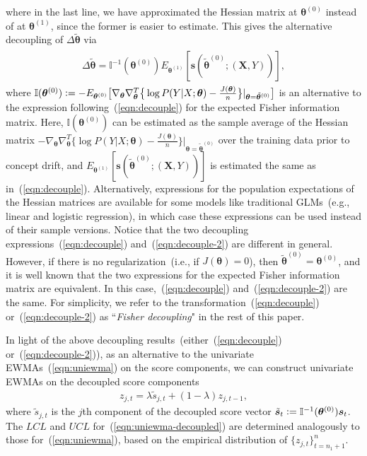 \documentclass[twoside,11pt]{article}
\begin{document}
where in the last line, we have approximated the Hessian matrix at $\bm{\theta}^{(0)}$ instead of at $\bm{\theta}^{(1)}$, since the former is easier to estimate. This gives the alternative decoupling of $\Delta \tilde{\bm { \theta}}$ via 
\begin{align}
\begin{aligned}
 \Delta \tilde{\bm { \theta}} = \mathbb {I}^{-1}(\bm { \theta}^{ (0)}) E_{\bm{ \theta}^{ (1)}}[\bm{s}(\tilde{ \bm { \theta}} ^{ (0)}; (\bm {X}, Y))], 
\end{aligned}
\label{eqn:decouple-2}
\end{align}
where $\mathbb {I}(\bm { \theta}^{ (0)}) \vcentcolon= - E_{\bm { \theta}^{ (0)}} \big[ \nabla_{\bm{\theta}} \nabla^T_{\bm{\theta}} \big\{ \log{P(Y | X; \bm{\theta})} - \frac{J(\bm{\theta})}{n} \big\} |_{\bm{\theta} = \tilde{\bm{\theta}}^{(0)}} \big]$ is an alternative to the expression following~(\ref{eqn:decouple}) for the expected Fisher information matrix. Here, $\mathbb {I}(\bm { \theta}^{ (0)})$ can be estimated as the sample average of the Hessian matrix $-\nabla_{\bm{\theta}} \nabla^T_{\bm{\theta}} \big\{ \log{P(Y | X; \bm{\theta})} - \frac{J(\bm{\theta})}{n} \big\} |_{\bm{\theta} = \tilde{\bm{\theta}}^{(0)}}$ over the training data prior to concept drift, and $E_{\bm{ \theta}^{ (1)}} [\bm{s}(\tilde{ \bm { \theta}} ^{ (0)}; (\bm {X}, Y))]$ is estimated the same as in~(\ref{eqn:decouple}). Alternatively, expressions for the population expectations of the Hessian matrices are available for some models like traditional GLMs~(e.g., linear and logistic regression), in which case these expressions can be used instead of their sample versions. Notice that the two decoupling expressions~(\ref{eqn:decouple}) and~(\ref{eqn:decouple-2}) are different in general. However, if there is no regularization~(i.e., if $J(\bm{\theta}) = 0$), then $\tilde{ \bm { \theta}} ^{ (0)} = \bm { \theta} ^{ (0)}$, and it is well known that the two expressions for the expected Fisher information matrix are equivalent. In this case,~(\ref{eqn:decouple}) and~(\ref{eqn:decouple-2}) are the same. For simplicity, we refer to the transformation~(\ref{eqn:decouple}) or~(\ref{eqn:decouple-2}) as ``\textit{Fisher decoupling}" in the rest of this paper.
 
In light of the above decoupling results~(either~(\ref{eqn:decouple}) or~(\ref{eqn:decouple-2})), as an alternative to the univariate EWMAs~(\ref{eqn:uniewma}) on the score components, we can construct univariate EWMAs on the decoupled score components
\begin{align}
z_{j,t} = \lambda \tilde{s}_{j,t} + (1 - \lambda) z_{j,t-1},
\label{eqn:uniewma-decoupled}
\end{align}
where $\tilde{s}_{j,t}$ is the $j$th component of the decoupled score vector $\tilde{\bm{s}}_t \vcentcolon= \mathbb {I}^{-1}(\bm { \theta}^{ (0)})\bm{s}_t$. The $LCL$ and $UCL$ for~(\ref{eqn:uniewma-decoupled}) are determined analogously to those for~(\ref{eqn:uniewma}), based on the empirical distribution of $\{z_{j,t}\}_{t=n_1+1}^n$.  
\end{document}
